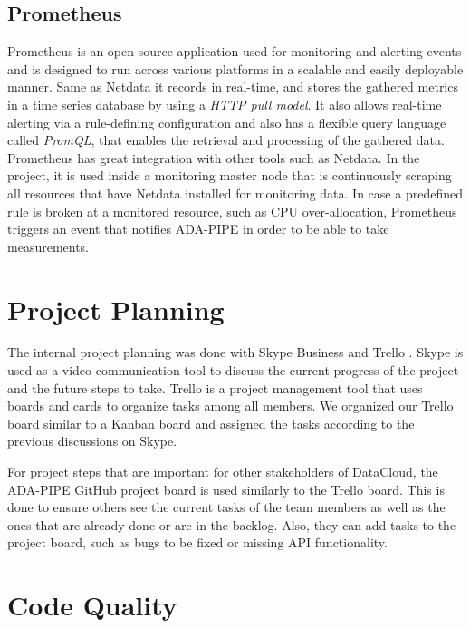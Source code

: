 \documentclass{article}
\begin{document}
        \subsection{Prometheus}
        \label{sec:prometheus-monitoring}
            Prometheus \cite{prometheusOverviewPrometheus} is an open-source application used for monitoring and alerting events and is designed to run across various platforms in a scalable and easily deployable manner.
            Same as Netdata it records in real-time, and stores the gathered metrics in a time series database by using a \emph{HTTP pull model}. It also allows real-time alerting via a rule-defining configuration and also has a flexible query language called \emph{PromQL}, that enables the retrieval and processing of the gathered data. Prometheus has great integration with other tools such as Netdata.
            In the project, it is used inside a monitoring master node that is continuously scraping all resources that have Netdata installed for monitoring data. In case a predefined rule is broken at a monitored resource, such as CPU over-allocation, Prometheus triggers an event that notifies ADA-PIPE in order to be able to take measurements.
            

    \section{Project Planning}
    \label{sec:project-planning}

        The internal project planning was done with Skype Business \cite{microsoftSkypeStayConnected} and Trello \cite{atlassianManageYourTeam}.
        Skype is used as a video communication tool to discuss the current progress of the project and the future steps to take.
        Trello is a project management tool that uses boards and cards to organize tasks among all members.
        We organized our Trello board similar to a Kanban board and assigned the tasks according to the previous discussions on Skype.
        
        For project steps that are important for other stakeholders of DataCloud, the ADA-PIPE GitHub project board is used similarly to the Trello board. This is done to ensure others see the current tasks of the team members as well as the ones that are already done or are in the backlog. Also, they can add tasks to the project board, such as bugs to be fixed or missing API functionality.
        
    \section{Code Quality}
    \label{sec:code-quality}
\end{document}
